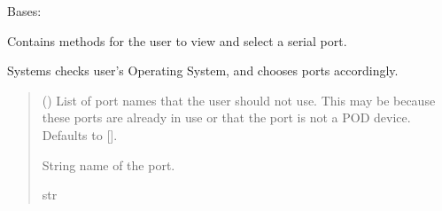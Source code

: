 \documentclass[letterpaper,10pt,english]{sphinxmanual}
\begin{document}
\begin{fulllineitems}
\label{\detokenize{PodApi.Devices.SerialPorts:PodApi.Devices.SerialPorts.PortAccess.FindPorts}}
\pysigstartsignatures
{}
\pysigstopsignatures
\sphinxAtStartPar
Bases: 

\sphinxAtStartPar
Contains methods for the user to view and select a serial port.

\begin{fulllineitems}
\label{\detokenize{PodApi.Devices.SerialPorts:PodApi.Devices.SerialPorts.PortAccess.FindPorts.ChoosePort}}
\pysigstartsignatures
{}
\pysigstopsignatures
\sphinxAtStartPar
Systems checks user’s Operating System, and chooses ports accordingly.
\begin{quote}\begin{description}
\sphinxAtStartPar
{} (\sphinxstyleliteralemphasis{\sphinxupquote{{[}}}\sphinxstyleliteralemphasis{\sphinxupquote{{]}}}\sphinxstyleliteralemphasis{\sphinxupquote{, }}) \textendash{} List of port names that the user should                 not use. This may be because these ports are already in use or that                 the port is not a POD device. Defaults to {[}{]}.

\sphinxAtStartPar
String name of the port.

\sphinxAtStartPar
str

\end{description}\end{quote}

\end{fulllineitems}


\end{fulllineitems}
\end{document}
